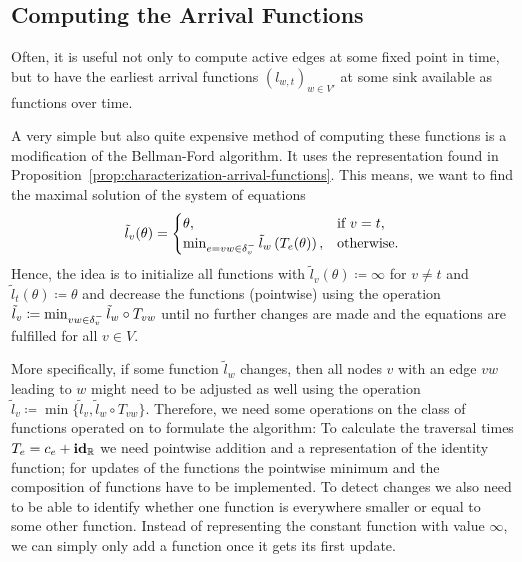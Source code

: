 \subsection{Computing the Arrival Functions}

Often, it is useful not only to compute active edges at some fixed point in time, but to have the earliest arrival functions $(l_{w,t})_{w\in V'}$ at some sink available as functions over time.

A very simple but also quite expensive method of computing these functions is a modification of the Bellman-Ford algorithm. 
It uses the representation found in Proposition~\ref{prop:characterization-arrival-functions}.
This means, we want to find the maximal solution of the system of equations \[
    \tilde l_v(\theta) = \begin{cases}
        \theta, &\text{if $v = t$}, \\
        \min_{\substack{
            e=vw\in\delta^-_{v}               
        }} \tilde{l}_w\left(
            T_e(\theta)
        \right), &\text{otherwise}.
    \end{cases}
\]
Hence, the idea is to initialize all functions with $\tilde l_v(\theta) \coloneqq \infty$ for $v\neq t$ and $\tilde l_t(\theta) \coloneqq \theta$ and decrease the functions (pointwise) using the operation $\tilde l_v \coloneqq \min_{vw\in\delta^-_{v}} \tilde l_w \circ T_{vw}$ until no further changes are made and the equations are fulfilled for all $v\in V$.

More specifically, if some function $\tilde l_w$ changes, then all nodes $v$ with an edge $vw$ leading to $w$ might need to be adjusted as well using the operation $\tilde l_v \coloneqq \min\{ \tilde l_v, \tilde l_w \circ T_{vw} \}$.
Therefore, we need some operations on the class of functions operated on to formulate the algorithm:
To calculate the traversal times $T_e = c_e + \mathbf{id}_{\mathbb{R}}$ we need pointwise addition and a representation of the identity function; for updates of the functions the pointwise minimum and the composition of functions have to be implemented.
To detect changes we also need to be able to identify whether one function is everywhere smaller or equal to some other function. 
Instead of representing the constant function with value $\infty$, we can simply only add a function once it gets its first update.

